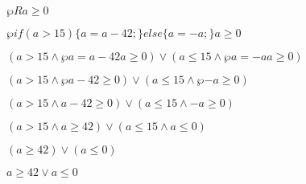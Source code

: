 \documentclass{lehramt-informatik-aufgabe}
\begin{document}

$\wp{R}{a \geq 0}$

$\wp{if (a > 15) \{a = a - 42;\} else \{ a = -a;\}}{a \geq 0}$

$
(a > 15 \land \wp{a = a - 42}{a \geq 0})
\lor
(a \leq 15 \land \wp{a = -a}{a \geq 0})
$

$
(a > 15 \land \wp{}{a - 42 \geq 0})
\lor
(a \leq 15 \land \wp{}{-a \geq 0})
$

$
(a > 15 \land a - 42 \geq 0)
\lor
(a \leq 15 \land -a \geq 0)
$

$
(a > 15 \land a \geq 42)
\lor
(a \leq 15 \land a \leq 0)
$

$
(a \geq 42)
\lor
(a \leq 0)
$

$
a \geq 42
\lor
a \leq 0
$
\end{document}
